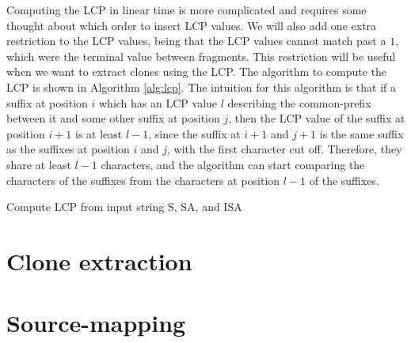 Computing the LCP in linear time is more complicated and requires some thought about which
order to insert LCP values. We will also add one extra restriction to the LCP values,
being that the LCP values cannot match past a $1$, which were the terminal value between
fragments. This restriction will be useful when we want to extract clones using the LCP.
The algorithm to compute the LCP is shown in Algorithm \ref{alg:lcp}. The intuition for
this algorithm is that if a suffix at position $i$ which has an LCP value $l$ describing
the common-prefix between it and some other suffix at position $j$, then the LCP value of
the suffix at position $i + 1$ is at least $l - 1$, since the suffix at $i + 1$ and $j +
1$ is the same suffix as the suffixes at position $i$ and $j$, with the first character
cut off. Therefore, they share at least $l - 1$ characters, and the algorithm can start
comparing the characters of the suffixes from the characters at position $l - 1$ of the
suffixes.

\begin{algorithm}[htp]
  \SetAlgoLined\DontPrintSemicolon

  \vspace{0.5cm}
  \caption{Compute LCP from input string S, SA, and ISA}
  \label{alg:lcp}
\end{algorithm}


\section{Clone extraction}

\section{Source-mapping}


